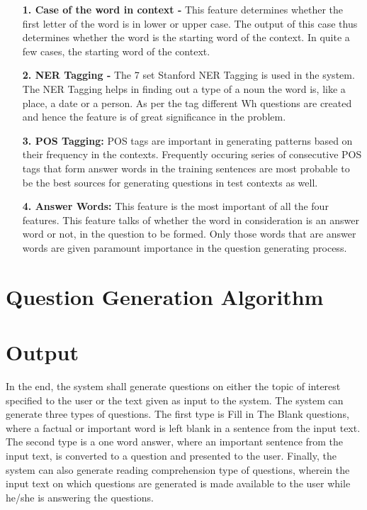 \begin{itemize}[align=left]
	\item [\textbf{1. Case of the word in context -}] 
This feature determines whether the first letter of the word is in lower or upper case. The output of this case thus determines whether the word is the starting word of the context. In quite a few cases, the starting word of the context.

	\item [\textbf{2. NER Tagging -}] 
The 7 set Stanford NER Tagging is used in the system. The NER Tagging helps in finding out a type of a noun the word is, like a place, a date or a person. As per the tag different Wh questions are created and hence the feature is of great significance in the problem.

	\item [\textbf{3. POS Tagging:}] 
	POS tags are important in generating patterns based on their frequency in the contexts. Frequently occuring series of consecutive POS tags that form answer words in the training sentences are most probable to be the best sources for generating questions in test contexts as well. 

	\item [\textbf{4. Answer Words:}]
	This feature is the most important of all the four features. This feature talks of whether the word in consideration is an answer word or not, in the question to be formed. Only those words that are answer words are given paramount importance in the question generating process. 

\end{itemize}

\section{Question Generation Algorithm}



\section{Output}
In the end, the system shall generate questions on either the topic of interest specified to the user or the text given as input to the system. The system can generate three types of questions. The first type is Fill in The Blank questions, where a factual or important word is left blank in a sentence from the input text. The second type is a one word answer, where an important sentence from the input text, is converted to a question and presented to the user. Finally, the system can also generate reading comprehension type of questions, wherein the input text on which questions are generated is made available to the user while he/she is answering the questions. 
